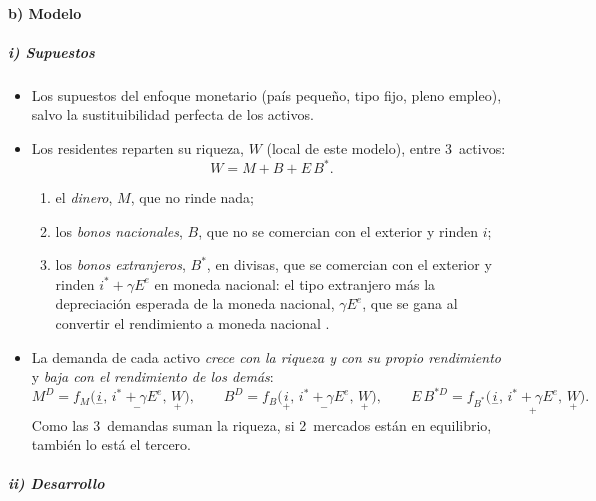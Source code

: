 \documentclass[11pt]{article}
\begin{document}
\paragraph{b) Modelo}

\subparagraph{i) Supuestos}

\begin{itemize}
\item Los supuestos del enfoque monetario (país pequeño, tipo fijo, pleno empleo), salvo la sustituibilidad perfecta de los activos.
\item Los residentes reparten su riqueza, $W$ (local de este modelo), entre 3~activos:
  \begin{equation}\label{eq:riqueza-cartera}
  W=M+B+E\,B^* .
  \end{equation}
  \begin{enumerate}
  \item el \emph{dinero}, $M$, que no rinde nada;
  \item los \emph{bonos nacionales}, $B$, que no se comercian con el exterior y rinden $i$;
  \item los \emph{bonos extranjeros}, $B^*$, en divisas, que se comercian con el exterior y rinden $i^*+\gamma E^e$ en moneda nacional: el tipo extranjero más la depreciación esperada de la moneda nacional, $\gamma E^e$, que se gana al convertir el rendimiento a moneda nacional .
  \end{enumerate}
\item La demanda de cada activo \emph{crece con la riqueza y con su propio rendimiento} y \emph{baja con el rendimiento de los demás}:
  \begin{equation}\label{eq:demandas-cartera}
  M^D=f_M\big(\underset{-}{i},\,\underset{-}{i^*+\gamma E^e},\,\underset{+}{W}\big),\qquad
  B^D=f_B\big(\underset{+}{i},\,\underset{-}{i^*+\gamma E^e},\,\underset{+}{W}\big),\qquad
  E\,B^{*D}=f_{B^*}\big(\underset{-}{i},\,\underset{+}{i^*+\gamma E^e},\,\underset{+}{W}\big).
  \end{equation}
  Como las 3~demandas suman la riqueza, si 2~mercados están en equilibrio, también lo está el tercero.
\end{itemize}

\subparagraph{ii) Desarrollo}
\end{document}

